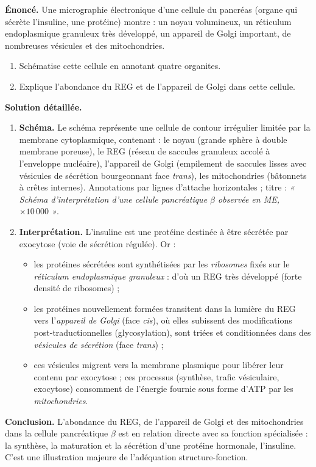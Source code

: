\documentclass[11pt]{article}
\newcommand{\cle}[1]{{\popxbold\color{popdark}#1}}
\begin{document}
\begin{exoresolu}
\textbf{Énoncé.} Une micrographie électronique d'une cellule du pancréas (organe qui sécrète l'insuline, une protéine) montre : un noyau volumineux, un réticulum endoplasmique granuleux très développé, un appareil de Golgi important, de nombreuses vésicules et des mitochondries.
\begin{enumerate}
\item Schématise cette cellule en annotant quatre organites.
\item Explique l'abondance du REG et de l'appareil de Golgi dans cette cellule.
\end{enumerate}
\tcblower
\textbf{Solution détaillée.}
\begin{enumerate}
\item \textbf{Schéma.} Le schéma représente une cellule de contour irrégulier limitée par la membrane cytoplasmique, contenant : le noyau (grande sphère à double membrane poreuse), le REG (réseau de saccules granuleux accolé à l'enveloppe nucléaire), l'appareil de Golgi (empilement de saccules lisses avec vésicules de sécrétion bourgeonnant face \emph{trans}), les mitochondries (bâtonnets à crêtes internes). Annotations par lignes d'attache horizontales ; titre : \emph{« Schéma d'interprétation d'une cellule pancréatique $\beta$ observée en ME, $\times 10\,000$ »}.
\item \textbf{Interprétation.} L'insuline est une \cle{protéine} destinée à être \cle{sécrétée} par exocytose (voie de sécrétion régulée). Or :
\begin{itemize}
\item les protéines sécrétées sont synthétisées par les \emph{ribosomes} fixés sur le \emph{réticulum endoplasmique granuleux} : d'où un REG très développé (forte densité de ribosomes) ;
\item les protéines nouvellement formées transitent dans la lumière du REG vers l'\emph{appareil de Golgi} (face \emph{cis}), où elles subissent des modifications post-traductionnelles (glycosylation), sont triées et conditionnées dans des \emph{vésicules de sécrétion} (face \emph{trans}) ;
\item ces vésicules migrent vers la membrane plasmique pour libérer leur contenu par \cle{exocytose} ; ces processus (synthèse, trafic vésiculaire, exocytose) consomment de l'énergie fournie sous forme d'ATP par les \emph{mitochondries}.
\end{itemize}
\end{enumerate}
\textbf{Conclusion.} L'abondance du REG, de l'appareil de Golgi et des mitochondries dans la cellule pancréatique $\beta$ est en relation directe avec sa fonction spécialisée : la synthèse, la maturation et la sécrétion d'une protéine hormonale, l'insuline. C'est une illustration majeure de l'adéquation structure-fonction.
\end{exoresolu}
\end{document}
